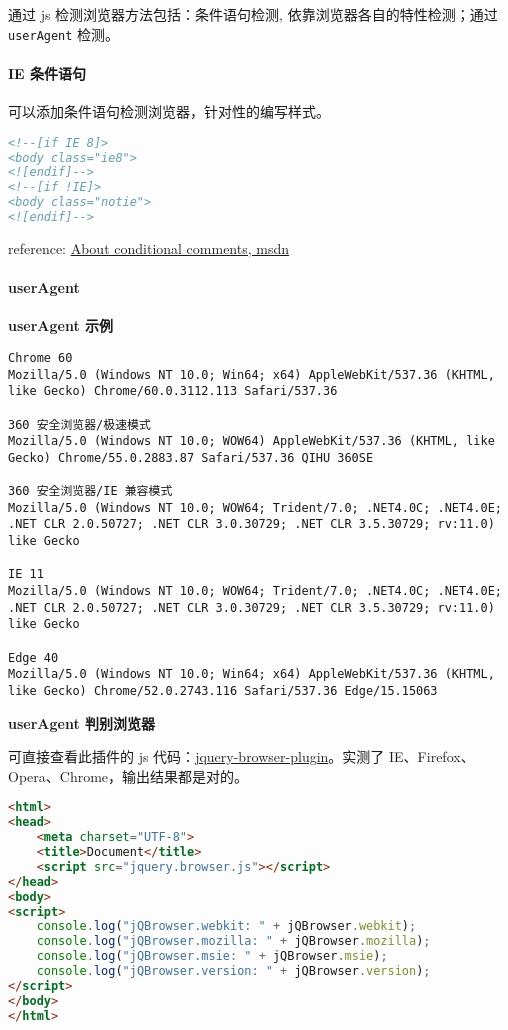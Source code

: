 通过 js 检测浏览器方法包括：条件语句检测, 依靠浏览器各自的特性检测；通过
\lstinline!userAgent! 检测。

\paragraph{IE 条件语句}\label{ie-ux6761ux4ef6ux8bedux53e5}

可以添加条件语句检测浏览器，针对性的编写样式。

\begin{lstlisting}[language=HTML]
<!--[if IE 8]>
<body class="ie8">
<![endif]-->
<!--[if !IE]>
<body class="notie">
<![endif]-->
\end{lstlisting}

reference:
\href{https://msdn.microsoft.com/en-us/library/ms537512(v=vs.85).aspx}{About
conditional comments, msdn}

\paragraph{userAgent}\label{useragent}

\textbf{userAgent 示例}

\begin{lstlisting}
Chrome 60
Mozilla/5.0 (Windows NT 10.0; Win64; x64) AppleWebKit/537.36 (KHTML, like Gecko) Chrome/60.0.3112.113 Safari/537.36

360 安全浏览器/极速模式
Mozilla/5.0 (Windows NT 10.0; WOW64) AppleWebKit/537.36 (KHTML, like Gecko) Chrome/55.0.2883.87 Safari/537.36 QIHU 360SE

360 安全浏览器/IE 兼容模式
Mozilla/5.0 (Windows NT 10.0; WOW64; Trident/7.0; .NET4.0C; .NET4.0E; .NET CLR 2.0.50727; .NET CLR 3.0.30729; .NET CLR 3.5.30729; rv:11.0) like Gecko

IE 11
Mozilla/5.0 (Windows NT 10.0; WOW64; Trident/7.0; .NET4.0C; .NET4.0E; .NET CLR 2.0.50727; .NET CLR 3.0.30729; .NET CLR 3.5.30729; rv:11.0) like Gecko

Edge 40
Mozilla/5.0 (Windows NT 10.0; Win64; x64) AppleWebKit/537.36 (KHTML, like Gecko) Chrome/52.0.2743.116 Safari/537.36 Edge/15.15063
\end{lstlisting}

\textbf{userAgent 判别浏览器}

可直接查看此插件的 js
代码：\href{https://github.com/gabceb/jquery-browser-plugin}{jquery-browser-plugin}。实测了
IE、Firefox、Opera、Chrome，输出结果都是对的。

\begin{lstlisting}[language=HTML]
<html>
<head>
    <meta charset="UTF-8">
    <title>Document</title>
    <script src="jquery.browser.js"></script>
</head>
<body>
<script>
    console.log("jQBrowser.webkit: " + jQBrowser.webkit);
    console.log("jQBrowser.mozilla: " + jQBrowser.mozilla);
    console.log("jQBrowser.msie: " + jQBrowser.msie);
    console.log("jQBrowser.version: " + jQBrowser.version);
</script>
</body>
</html>
\end{lstlisting}

